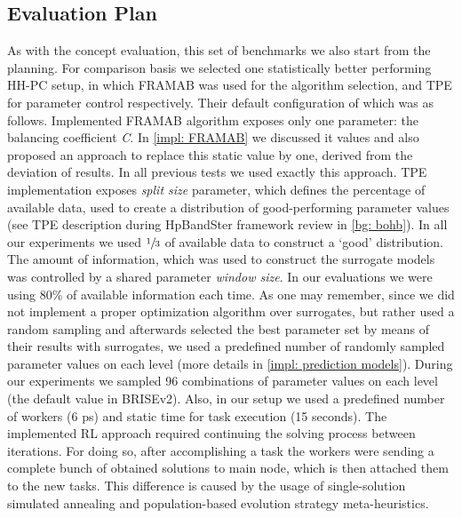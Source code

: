 \subsection{Evaluation Plan}\label{eval:2:plan}
As with the concept evaluation, this set of benchmarks we also start from the planning. For comparison basis we selected one statistically better performing HH-PC setup, in which FRAMAB was used for the algorithm selection, and TPE for parameter control respectively. Their default configuration of which was as follows. Implemented FRAMAB algorithm exposes only one parameter: the balancing coefficient \emph{C}. In \cref{impl: FRAMAB} we discussed it values and also proposed an approach to replace this static value by one, derived from the deviation of results. In all previous tests we used exactly this approach. TPE implementation exposes \emph{split size} parameter, which defines the percentage of available data, used to create a distribution of good-performing parameter values (see TPE description during HpBandSter framework review in \cref{bg: bohb}). In all our experiments we used $\sfrac{1}{3}$ of available data to construct a `good' distribution. The amount of information, which was used to construct the surrogate models was controlled by a shared parameter \emph{window size}. In our evaluations we were using 80\% of available information each time. As one may remember, since we did not implement a proper optimization algorithm over surrogates, but rather used a random sampling and afterwards selected the best parameter set by means of their results with surrogates, we used a predefined number of randomly sampled parameter values on each level (more details in \cref{impl: prediction models}). During our experiments we sampled 96 combinations of parameter values on each level (the default value in BRISEv2). Also, in our setup we used a predefined number of workers (6 ps) and static time for task execution (15 seconds). The implemented RL approach required continuing the solving process between iterations. For doing so, after accomplishing a task the workers were sending a complete bunch of obtained solutions to main node, which is then attached them to the new tasks. This difference is caused by the usage of single-solution simulated annealing and population-based evolution strategy meta-heuristics.

